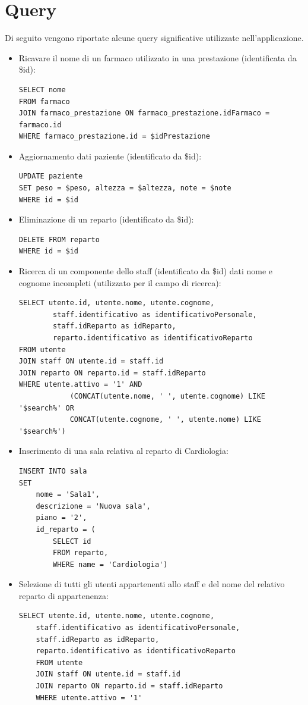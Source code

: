 \documentclass[paper=a4, fontsize=11pt,x11names]{report}
\begin{document}
\chapter{Query}
Di seguito vengono riportate alcune query significative utilizzate nell'applicazione.
\begin{itemize}
\item Ricavare il nome di un farmaco utilizzato in una prestazione (identificata da \$id):
\begin{verbatim}
SELECT nome
FROM farmaco
JOIN farmaco_prestazione ON farmaco_prestazione.idFarmaco = farmaco.id
WHERE farmaco_prestazione.id = $idPrestazione 
\end{verbatim}

\item Aggiornamento dati paziente (identificato da \$id):
\begin{verbatim}
UPDATE paziente
SET peso = $peso, altezza = $altezza, note = $note
WHERE id = $id 
\end{verbatim}

\item Eliminazione di un reparto (identificato da \$id):
\begin{verbatim}
DELETE FROM reparto
WHERE id = $id 
\end{verbatim}

\item Ricerca di un componente dello staff (identificato da \$id) dati nome e cognome incompleti (utilizzato per il campo di ricerca):
\begin{verbatim}
SELECT utente.id, utente.nome, utente.cognome, 
        staff.identificativo as identificativoPersonale, 
        staff.idReparto as idReparto,
        reparto.identificativo as identificativoReparto 
FROM utente
JOIN staff ON utente.id = staff.id
JOIN reparto ON reparto.id = staff.idReparto
WHERE utente.attivo = '1' AND
            (CONCAT(utente.nome, ' ', utente.cognome) LIKE '$search%' OR 
            CONCAT(utente.cognome, ' ', utente.nome) LIKE '$search%')
\end{verbatim}

\item Inserimento di una sala relativa al reparto di Cardiologia:
\begin{verbatim}
INSERT INTO sala 
SET 
	nome = 'Sala1', 
	descrizione = 'Nuova sala', 
	piano = '2', 
    id_reparto = (
    	SELECT id
        FROM reparto,
        WHERE name = 'Cardiologia')
\end{verbatim}

\item Selezione di tutti gli utenti appartenenti allo staff e del nome del relativo reparto di appartenenza:
\begin{verbatim}
SELECT utente.id, utente.nome, utente.cognome, 
    staff.identificativo as identificativoPersonale, 
    staff.idReparto as idReparto,
    reparto.identificativo as identificativoReparto 
    FROM utente
    JOIN staff ON utente.id = staff.id
    JOIN reparto ON reparto.id = staff.idReparto
    WHERE utente.attivo = '1'
\end{verbatim}

\end{itemize}
\end{document}
